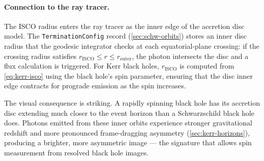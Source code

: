 \paragraph{Connection to the ray tracer.}

The ISCO radius enters the ray tracer as the inner edge of the
accretion disc model.  The \texttt{TerminationConfig} record
(\cref{sec:schw-orbits}) stores an inner disc radius that the
geodesic integrator checks at each equatorial-plane crossing: if
the crossing radius satisfies
$r_{\text{ISCO}} \leq r \leq r_{\text{outer}}$, the photon
intersects the disc and a flux calculation is triggered.  For Kerr
black holes, $r_{\text{ISCO}}$ is computed from
\cref{eq:kerr-isco} using the black hole's spin parameter, ensuring
that the disc inner edge contracts for prograde emission as the
spin increases.

The visual consequence is striking.  A rapidly spinning black hole
has its accretion disc extending much closer to the event horizon
than a Schwarzschild black hole does.  Photons emitted from these
inner orbits experience stronger gravitational redshift and more
pronounced frame-dragging asymmetry (\cref{sec:kerr-horizons}),
producing a brighter, more asymmetric image --- the signature that
allows spin measurement from resolved black hole images.
